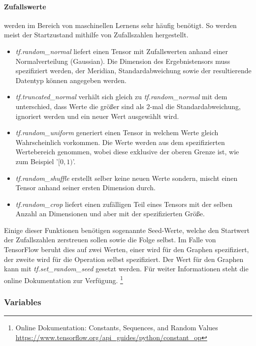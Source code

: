 \paragraph{Zufallswerte} werden im Bereich von maschinellen Lernens sehr häufig benötigt. 
So werden meist der Startzustand mithilfe von Zufallszahlen hergestellt. 

\begin{itemize}
	\item \textit{tf.random\_normal} liefert einen Tensor mit Zufallswerten anhand einer Normalverteilung (Gaussian). 
	Die Dimension des Ergebnistensors muss spezifiziert werden, der Meridian, Standardabweichung sowie der resultierende Datentyp können angegeben werden. 
	\item \textit{tf.truncated\_normal} verhält sich gleich zu \textit{tf.random\_normal} mit dem unterschied, dass Werte die größer sind als $2$-mal die Standardabweichung, ignoriert werden und ein neuer Wert ausgewählt wird.
	\item \textit{tf.random\_uniform} generiert einen Tensor in welchem Werte gleich Wahrscheinlich vorkommen.
	Die Werte werden aus dem spezifizierten Wertebereich genommen, wobei diese exklusive der oberen Grenze ist, wie zum Beispiel '$[0, 1)$'.
	\item \textit{tf.random\_shuffle} erstellt selber keine neuen Werte sondern, mischt einen Tensor anhand seiner ersten Dimension durch. 
	\item \textit{tf.random\_crop} liefert einen zufälligen Teil eines Tensors mit der selben Anzahl an Dimensionen und aber mit der spezifizierten Größe.
\end{itemize} \phantom \newline

\noindent
Einige dieser Funktionen benötigen sogenannte Seed-Werte, welche den Startwert der Zufallszahlen zerstreuen sollen sowie die Folge selbst. 
Im Falle von TensorFlow beruht dies auf zwei Werten, einer wird für den Graphen spezifiziert, der zweite wird für die Operation selbst spezifiziert. 
Der Wert für den Graphen kann mit \textit{tf.set\_random\_seed} gesetzt werden. 
Für weiter Informationen steht die online Dokumentation zur Verfügung. \footnote{Online Dokumentation: Constants, Sequences, and Random Values  \url{https://www.tensorflow.org/api_guides/python/constant_op}}

\subsubsection{Variables}

